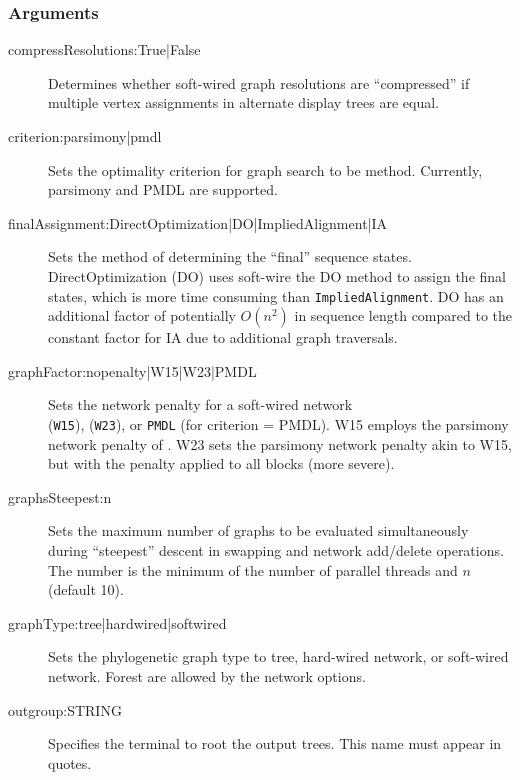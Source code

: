 	\subsubsection{Arguments}
		\begin{description}
			\item[compressResolutions:True|False] %
			Determines whether soft-wired graph 
			resolutions are ``compressed'' if multiple vertex assignments in alternate display 
			trees are equal.
			
			\item[criterion:parsimony|pmdl] Sets the optimality criterion for graph search to be 
			method. Currently, parsimony and PMDL \citep{WheelerandVaron2022} are supported.
			
			\item[finalAssignment:DirectOptimization|DO|ImpliedAlignment|IA] Sets the method 
			of determining the ``final'' sequence states. DirectOptimization (DO) uses soft-wire the DO 
			method to assign the final states, which is more time consuming than \texttt{ImpliedAlignment}. 
			DO has an additional factor of potentially $O(n^2)$ in sequence length compared 
			to the constant factor for IA due to additional graph traversals.
			
			\item[graphFactor:nopenalty|W15|W23|PMDL] Sets the network penalty for a soft-wired network\\ 
			(\texttt{W15}),  (\texttt{W23}), or \texttt{PMDL} (for criterion = PMDL). W15 employs the
			parsimony network penalty of \cite{Wheeler2015}. W23 sets the parsimony network penalty akin to
			W15, but with the penalty applied to all blocks (more severe).
			
			\item[graphsSteepest:n] Sets the maximum number of graphs to be evaluated simultaneously during ``steepest'' descent 
			in swapping and network add/delete operations. The number is the minimum of the number of parallel threads and $n$
			(default 10).
			
			\item[graphType:tree|hardwired|softwired] Sets the phylogenetic graph type to tree, 
			hard-wired network, or soft-wired network. Forest are allowed by the network options.
			
			
			\item[outgroup:STRING] Specifies the terminal to root the output trees. 
			This name must appear in quotes. 
			

\end{description}
